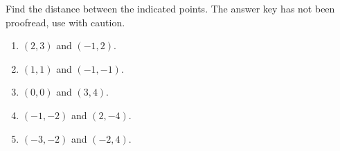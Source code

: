 Find the distance between the indicated points. The answer key has not been proofread, use with caution.
\begin{multicols}{2}
\begin{enumerate}[ref={\fcProblemRef}]
\item $(2,3)$ and $(-1, 2)$.

\item $(1,1)$ and $(-1, -1)$.

\item $(0,0)$ and $(3, 4)$.

\item $(-1,-2)$ and $(2, -4)$.

\item $(-3,-2)$ and $(-2, 4)$.

\end{enumerate}
\end{multicols}